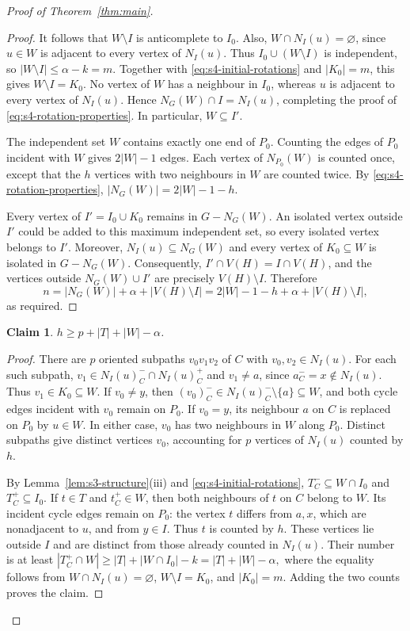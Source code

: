 \documentclass[11pt]{article}
\numberwithin{equation}{section}
\theoremstyle{plain}
\theoremstyle{definition}
\theoremstyle{plain}
\newtheorem{claim}{Claim}[section]
\begin{document}
\begin{proof}[Proof of Theorem~\ref{thm:main}]
\begin{proof}
It follows that $W\setminus I$ is anticomplete to $I_0$.
Also, $W\cap N_I(u)=\varnothing$, since $u\in W$ is adjacent to
every vertex of $N_I(u)$.
Thus $I_0\cup(W\setminus I)$ is independent, so
$|W\setminus I|\leq\alpha-k=m$.
Together with \eqref{eq:s4-initial-rotations} and $|K_0|=m$, this gives
$W\setminus I=K_0$.
No vertex of $W$ has a neighbour in $I_0$, whereas $u$ is adjacent to
every vertex of $N_I(u)$.
Hence $N_G(W)\cap I=N_I(u)$, completing the proof of
\eqref{eq:s4-rotation-properties}.
In particular, $W\subseteq I'$.

The independent set $W$ contains exactly one end of $P_0$.
Counting the edges of $P_0$ incident with $W$ gives $2|W|-1$ edges.
Each vertex of $N_{P_0}(W)$ is counted once, except that the $h$
vertices with two neighbours in $W$ are counted twice.
By \eqref{eq:s4-rotation-properties},
$|N_G(W)|=2|W|-1-h$.

Every vertex of $I'=I_0\cup K_0$ remains in $G-N_G(W)$.
An isolated vertex outside $I'$ could be added to this maximum
independent set, so every isolated vertex belongs to $I'$.
Moreover, $N_I(u)\subseteq N_G(W)$ and every vertex of
$K_0\subseteq W$ is isolated in $G-N_G(W)$.
Consequently, $I'\cap V(H)=I\cap V(H)$, and the vertices outside
$N_G(W)\cup I'$ are precisely $V(H)\setminus I$.
Therefore
\[
 n=|N_G(W)|+\alpha+|V(H)\setminus I|
  =2|W|-1-h+\alpha+|V(H)\setminus I|,
\]
as required.
\end{proof}

\begin{claim}\label{claim:h}
    $h\geq p+|T|+|W|-\alpha$.
\end{claim}

\begin{proof}
There are $p$ oriented subpaths $v_0v_1v_2$ of $C$ with
$v_0,v_2\in N_I(u)$.
For each such subpath,
$v_1\in N_I(u)_C^-\cap N_I(u)_C^+$ and $v_1\neq a$, since
$a_C^-=x\notin N_I(u)$.
Thus $v_1\in K_0\subseteq W$.
If $v_0\neq y$, then
$(v_0)_C^-\in N_I(u)_C^-\setminus\{a\}\subseteq W$,
and both cycle edges incident with $v_0$ remain on $P_0$.
If $v_0=y$, its neighbour $a$ on $C$ is replaced on $P_0$ by
$u\in W$.
In either case, $v_0$ has two neighbours in $W$ along $P_0$.
Distinct subpaths give distinct vertices $v_0$, accounting for $p$
vertices of $N_I(u)$ counted by $h$.

By Lemma~\ref{lem:s3-structure}\textup{(iii)} and
\eqref{eq:s4-initial-rotations},
$T_C^-\subseteq W\cap I_0$ and $T_C^+\subseteq I_0$.
If $t\in T$ and $t_C^+\in W$, then both neighbours of $t$ on $C$
belong to $W$.
Its incident cycle edges remain on $P_0$: the vertex $t$ differs from
$a,x$, which are nonadjacent to $u$, and from $y\in I$.
Thus $t$ is    counted by $h$.
These vertices lie outside $I$ and are distinct from those already
counted in $N_I(u)$.
Their number is at least
 $|T_C^+\cap W|
 \geq |T|+|W\cap I_0|-k
 =|T|+|W|-\alpha,$
where the equality follows from
$W\cap N_I(u)=\varnothing$, $W\setminus I=K_0$, and $|K_0|=m$.
Adding the two counts proves the claim.
\end{proof}


\end{proof}
\end{document}
